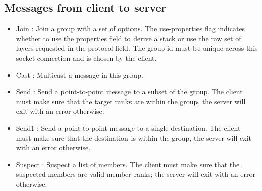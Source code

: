 
\subsection{Messages from client to server}
\begin{itemize}
\item{Join} : Join a group with a set of options. The use-properties
  flag indicates whether to use the properties field to derive a stack
  or use the raw set of layers requested in the protocol field. The
  group-id must be unique across this socket-connection and is
  chosen by the client. 
\begin{FormatTable}
\end{FormatTable}

\item{Cast} : Multicast a message in this group.
\begin{FormatTable}
\end{FormatTable}

\item{Send} : Send a point-to-point message to a subset of the
  group. The client must make sure that the target ranks are within
  the group, the server will exit with an error otherwise. 
\begin{FormatTable}
\end{FormatTable}


\item{Send1} : Send a point-to-point message to a single destination. 
The client must make sure that the destination is within
  the group, the server will exit with an error otherwise. 
\begin{FormatTable}
\end{FormatTable}

\item{Suspect} : Suspect a list of members. The client must make sure
  that the suspected members are valid member ranks; the server will exit with an error otherwise. 
\begin{FormatTable}
\end{FormatTable}


\end{itemize}
